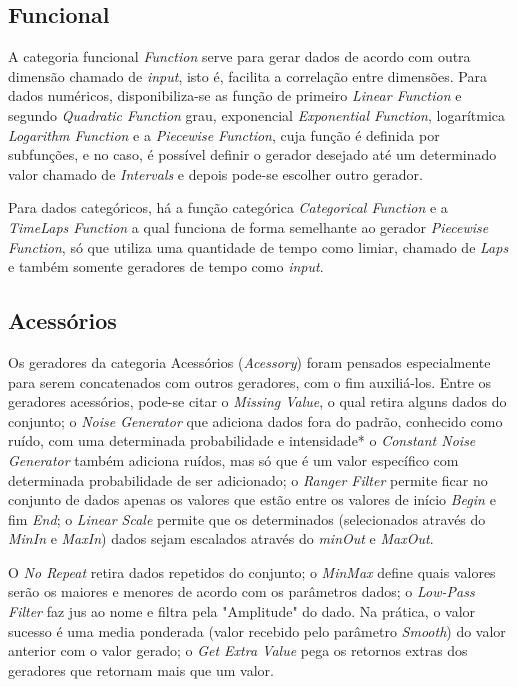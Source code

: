 \documentclass[
	12pt,				%
	openright,			%
	twoside,			%
	a4paper,			%
	english,			%
	brazil				%
	]{abntex2}
\begin{document}
		\subsection{Funcional}
			A categoria funcional \emph{Function} serve para gerar dados de acordo com outra dimensão chamado de \emph{input}, isto é, facilita a correlação entre dimensões.
			Para dados numéricos, disponibiliza-se as 
				função de primeiro \emph{Linear Function} e 
				segundo \emph{Quadratic Function} grau, 
				exponencial \emph{Exponential Function}, 
				logarítmica \emph{Logarithm Function} e
				a \emph{Piecewise Function}, cuja função é definida por subfunções, e no caso, é possível definir o gerador desejado até um determinado valor chamado de \emph{Intervals} e depois pode-se escolher outro gerador.
			\par
			Para dados categóricos, há a função categórica \emph{Categorical Function} e 
			a \emph{TimeLaps Function} a qual funciona de forma semelhante ao gerador \emph{Piecewise Function}, só que utiliza uma quantidade de tempo como limiar, chamado de \emph{Laps} e também somente geradores de tempo como \emph{input}.
		\subsection{Acessórios}
			Os geradores da categoria Acessórios (\emph{Acessory}) foram pensados especialmente para serem concatenados com outros geradores, com o fim auxiliá-los.
			Entre os geradores acessórios, pode-se citar o \emph{Missing Value}, o qual retira alguns dados do conjunto;
				o \emph{Noise Generator} que adiciona dados fora do padrão, conhecido como ruído, com uma determinada probabilidade e intensidade*
				o \emph{Constant Noise Generator} também adiciona ruídos, mas só que é um valor específico com determinada probabilidade de ser adicionado;
				o \emph{Ranger Filter} permite ficar no conjunto de dados apenas os valores que estão entre os valores de início \emph{Begin} e fim \emph{End};
				o \emph{Linear Scale} permite que os determinados (selecionados através do \emph{MinIn} e \emph{MaxIn}) dados sejam escalados através do \emph{minOut} e \emph{MaxOut}.
			\par
			O \emph{No Repeat} retira dados repetidos do conjunto;
				o \emph{MinMax} define quais valores serão os maiores e menores de acordo com os parâmetros dados;
				o \emph{Low-Pass Filter} faz jus ao nome e filtra pela "Amplitude" do dado. Na prática, o valor sucesso é uma media ponderada (valor recebido pelo parâmetro \emph{Smooth}) do valor anterior com o valor gerado;
				o \emph{Get Extra Value} pega os retornos extras dos geradores que retornam mais que um valor.
\end{document}
